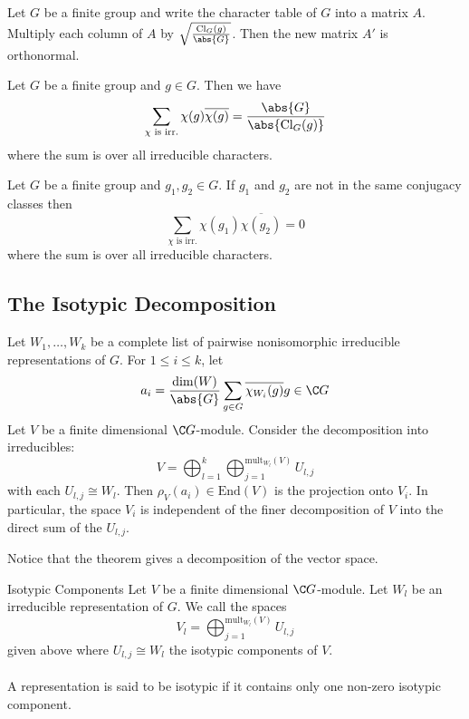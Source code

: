 \documentclass[a4paper]{article}
\begin{document}
\begin{crl}{}{} Let $G$ be a finite group and write the character table of $G$ into a matrix $A$. Multiply each column of $A$ by $\sqrt{\frac{\text{Cl}_G(g)}{\abs{G}}}$. Then the new matrix $A'$ is orthonormal. 
\end{crl}

\begin{crl}{}{} Let $G$ be a finite group and $g\in G$. Then we have $$\sum_{\chi\text{ is irr.}}\chi(g)\overline{\chi(g)}=\frac{\abs{G}}{\abs{\text{Cl}_G(g)}}$$ where the sum is over all irreducible characters. 
\end{crl}

\begin{crl}{}{} Let $G$ be a finite group and $g_1,g_2\in G$. If $g_1$ and $g_2$ are not in the same conjugacy classes then $$\sum_{\chi\text{ is irr.}}\chi(g_1)\overline{\chi(g_2)}=0$$ where the sum is over all irreducible characters. 
\end{crl}

\subsection{The Isotypic Decomposition}
\begin{thm}{}{} Let $W_1,\dots,W_k$ be a complete list of pairwise nonisomorphic irreducible representations of $G$. For $1\leq i\leq k$, let $$a_i=\frac{\dim(W)}{\abs{G}}\sum_{g\in G}\overline{\chi_{W_i}(g)}g\in\C G$$ Let $V$ be a finite dimensional $\C G$-module. Consider the decomposition into irreducibles: $$V=\bigoplus_{l=1}^k\bigoplus_{j=1}^{\text{mult}_{W_l}(V)}U_{l,j}$$ with each $U_{l,j}\cong W_l$. Then $\rho_V(a_i)\in\text{End}(V)$ is the projection onto $V_i$. In particular, the space $V_i$ is independent of the finer decomposition of $V$ into the direct sum of the $U_{l,j}$. 
\end{thm}

Notice that the theorem gives a decomposition of the vector space. 

\begin{defn}{Isotypic Components}{} Let $V$ be a finite dimensional $\C G$-module. Let $W_l$ be an irreducible representation of $G$. We call the spaces $$V_l=\bigoplus_{j=1}^{\text{mult}_{W_l}(V)}U_{l,j}$$ given above where $U_{l,j}\cong W_l$ the isotypic components of $V$. \\~\\

A representation is said to be isotypic if it contains only one non-zero isotypic component. 
\end{defn}
\end{document}
